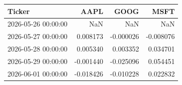 \begin{tabular}{lrrr}
\toprule
Ticker & AAPL & GOOG & MSFT \\
\midrule
2026-05-26 00:00:00 & NaN & NaN & NaN \\
2026-05-27 00:00:00 & 0.008173 & -0.000026 & -0.008076 \\
2026-05-28 00:00:00 & 0.005340 & 0.003352 & 0.034701 \\
2026-05-29 00:00:00 & -0.001440 & -0.025096 & 0.054451 \\
2026-06-01 00:00:00 & -0.018426 & -0.010228 & 0.022832 \\
\bottomrule
\end{tabular}
